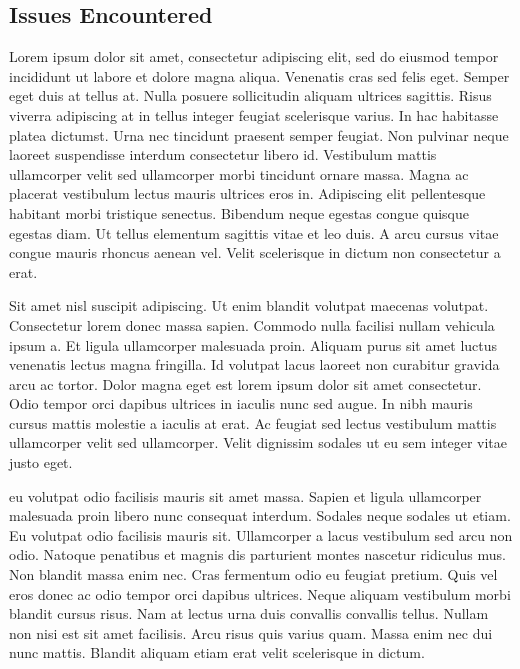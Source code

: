\documentclass[12pt]{article}
\begin{document}
\subsection{Issues Encountered}
Lorem ipsum dolor sit amet, consectetur adipiscing elit, sed do eiusmod tempor incididunt ut labore et dolore magna aliqua. Venenatis cras sed felis eget. Semper eget duis at tellus at. Nulla posuere sollicitudin aliquam ultrices sagittis. Risus viverra adipiscing at in tellus integer feugiat scelerisque varius. In hac habitasse platea dictumst. Urna nec tincidunt praesent semper feugiat. Non pulvinar neque laoreet suspendisse interdum consectetur libero id. Vestibulum mattis ullamcorper velit sed ullamcorper morbi tincidunt ornare massa. Magna ac placerat vestibulum lectus mauris ultrices eros in. Adipiscing elit pellentesque habitant morbi tristique senectus. Bibendum neque egestas congue quisque egestas diam. Ut tellus elementum sagittis vitae et leo duis. A arcu cursus vitae congue mauris rhoncus aenean vel. Velit scelerisque in dictum non consectetur a erat.\par
Sit amet nisl suscipit adipiscing. Ut enim blandit volutpat maecenas volutpat. Consectetur lorem donec massa sapien. Commodo nulla facilisi nullam vehicula ipsum a. Et ligula ullamcorper malesuada proin. Aliquam purus sit amet luctus venenatis lectus magna fringilla. Id volutpat lacus laoreet non curabitur gravida arcu ac tortor. Dolor magna eget est lorem ipsum dolor sit amet consectetur. Odio tempor orci dapibus ultrices in iaculis nunc sed augue. In nibh mauris cursus mattis molestie a iaculis at erat. Ac feugiat sed lectus vestibulum mattis ullamcorper velit sed ullamcorper. Velit dignissim sodales ut eu sem integer vitae justo eget.\par
{} eu volutpat odio facilisis mauris sit amet massa. Sapien et ligula ullamcorper malesuada proin libero nunc consequat interdum. Sodales neque sodales ut etiam. Eu volutpat odio facilisis mauris sit. Ullamcorper a lacus vestibulum sed arcu non odio. Natoque penatibus et magnis dis parturient montes nascetur ridiculus mus. Non blandit massa enim nec. Cras fermentum odio eu feugiat pretium. Quis vel eros donec ac odio tempor orci dapibus ultrices. Neque aliquam vestibulum morbi blandit cursus risus. Nam at lectus urna duis convallis convallis tellus. Nullam non nisi est sit amet facilisis. Arcu risus quis varius quam. Massa enim nec dui nunc mattis. Blandit aliquam etiam erat velit scelerisque in dictum.\par
\end{document}
